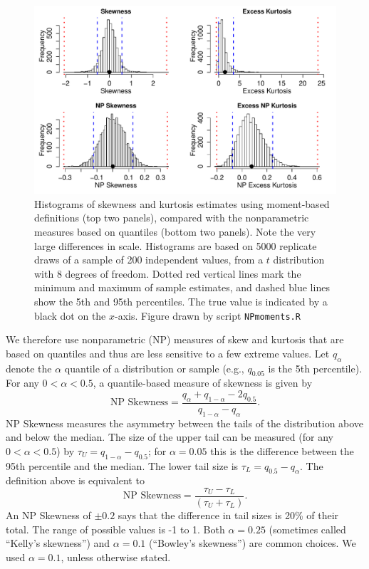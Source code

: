 \documentclass[12pt]{article}
\newcounter{box}
\newcommand{\be}{\begin{equation}}
\newcommand{\ee}{\end{equation}}
\begin{document}
\begin{figure}[tbp]
\includegraphics[width=\textwidth]{figures/NPmoments.pdf}
\caption{Histograms of skewness and kurtosis estimates using moment-based definitions (top two panels), compared with the nonparametric measures based on quantiles (bottom two panels). 
Note the very large differences in scale. Histograms are based on 5000 replicate draws 
of a sample of 200 independent values, from a $t$ distribution with 8 degrees of freedom. 
Dotted red vertical lines mark the minimum and maximum of sample estimates, and dashed blue lines show the 5th and 95th percentiles. 
The true value is indicated by a black dot on the $x$-axis.
Figure drawn by script \texttt{NPmoments.R}}
\label{fig:NPmoments}
\end{figure} 

We therefore use nonparametric (NP) measures of skew and kurtosis that are based on quantiles and thus are less sensitive to a few extreme values. 
Let $q_\alpha$ denote the $\alpha$ quantile of a distribution or sample (e.g., $q_{0.05}$ is the 5th percentile). 
For any $0 < \alpha < 0.5$, a quantile-based measure of skewness is given by \citep{mcgillivray-1986}
\be
\mbox{NP Skewness} = \frac{q_\alpha + q_{1-\alpha} - 2 q_{0.5}}{q_{1-\alpha} - q_\alpha}.
\ee
NP Skewness measures the asymmetry between the tails of the distribution above and below the median. 
The size of the upper tail can be measured (for any $0 < \alpha < 0.5$) by $\tau_U = q_{1-\alpha} - q_{0.5}$; for $\alpha=0.05$ this is the difference
between the 95th percentile and the median. 
The lower tail size is $\tau_L = q_{0.5} - q_\alpha$. The definition above is equivalent to  
\be
\mbox{NP Skewness} = \frac{\tau_U - \tau_L}{(\tau_U + \tau_L)}.
\label{eqn:NPskew}
\ee
An NP Skewness of $\pm 0.2$ says that the difference in tail sizes is 20\% of their total. 
The range of possible values is -1 to 1. Both $\alpha=0.25$ (sometimes called ``Kelly's skewness'') and $\alpha=0.1$ (``Bowley's skewness'') are common choices. 
We used $\alpha=0.1$, unless otherwise stated.  
 
\end{document}
